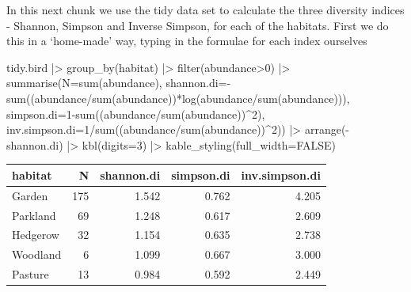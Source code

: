\documentclass[
  letterpaper,
  DIV=11,
  numbers=noendperiod]{scrreprt}
\newenvironment{Shaded}{\begin{snugshade}}{\end{snugshade}}
\newcommand{\AttributeTok}[1]{\textcolor[rgb]{0.40,0.45,0.13}{#1}}
\newcommand{\ConstantTok}[1]{\textcolor[rgb]{0.56,0.35,0.01}{#1}}
\newcommand{\DecValTok}[1]{\textcolor[rgb]{0.68,0.00,0.00}{#1}}
\newcommand{\FunctionTok}[1]{\textcolor[rgb]{0.28,0.35,0.67}{#1}}
\newcommand{\NormalTok}[1]{\textcolor[rgb]{0.00,0.23,0.31}{#1}}
\newcommand{\SpecialCharTok}[1]{\textcolor[rgb]{0.37,0.37,0.37}{#1}}
\begin{document}
In this next chunk we use the tidy data set to calculate the three
diversity indices - Shannon, Simpson and Inverse Simpson, for each of
the habitats. First we do this in a `home-made' way, typing in the
formulae for each index ourselves

\begin{Shaded}
\begin{Highlighting}[]
\NormalTok{tidy.bird }\SpecialCharTok{|\textgreater{}}
  \FunctionTok{group\_by}\NormalTok{(habitat) }\SpecialCharTok{|\textgreater{}}
  \FunctionTok{filter}\NormalTok{(abundance}\SpecialCharTok{\textgreater{}}\DecValTok{0}\NormalTok{) }\SpecialCharTok{|\textgreater{}}
  \FunctionTok{summarise}\NormalTok{(}\AttributeTok{N=}\FunctionTok{sum}\NormalTok{(abundance),}
            \AttributeTok{shannon.di=}\SpecialCharTok{{-}}\FunctionTok{sum}\NormalTok{((abundance}\SpecialCharTok{/}\FunctionTok{sum}\NormalTok{(abundance))}\SpecialCharTok{*}\FunctionTok{log}\NormalTok{(abundance}\SpecialCharTok{/}\FunctionTok{sum}\NormalTok{(abundance))),}
            \AttributeTok{simpson.di=}\DecValTok{1}\SpecialCharTok{{-}}\FunctionTok{sum}\NormalTok{((abundance}\SpecialCharTok{/}\FunctionTok{sum}\NormalTok{(abundance))}\SpecialCharTok{\^{}}\DecValTok{2}\NormalTok{),}
            \AttributeTok{inv.simpson.di=}\DecValTok{1}\SpecialCharTok{/}\FunctionTok{sum}\NormalTok{((abundance}\SpecialCharTok{/}\FunctionTok{sum}\NormalTok{(abundance))}\SpecialCharTok{\^{}}\DecValTok{2}\NormalTok{)) }\SpecialCharTok{|\textgreater{}}
  \FunctionTok{arrange}\NormalTok{(}\SpecialCharTok{{-}}\NormalTok{shannon.di) }\SpecialCharTok{|\textgreater{}}
  \FunctionTok{kbl}\NormalTok{(}\AttributeTok{digits=}\DecValTok{3}\NormalTok{) }\SpecialCharTok{|\textgreater{}}
  \FunctionTok{kable\_styling}\NormalTok{(}\AttributeTok{full\_width=}\ConstantTok{FALSE}\NormalTok{)}
\end{Highlighting}
\end{Shaded}

\begin{table}
\centering
\begin{tabular}[t]{l|r|r|r|r}
\hline
habitat & N & shannon.di & simpson.di & inv.simpson.di\\
\hline
Garden & 175 & 1.542 & 0.762 & 4.205\\
\hline
Parkland & 69 & 1.248 & 0.617 & 2.609\\
\hline
Hedgerow & 32 & 1.154 & 0.635 & 2.738\\
\hline
Woodland & 6 & 1.099 & 0.667 & 3.000\\
\hline
Pasture & 13 & 0.984 & 0.592 & 2.449\\
\hline
\end{tabular}
\end{table}
\end{document}
